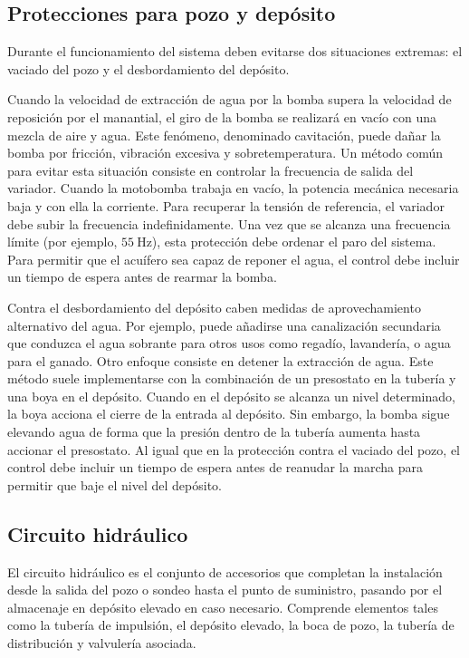 \subsection{Protecciones para pozo y depósito}

Durante el funcionamiento del sistema deben evitarse dos situaciones
extremas: el vaciado del pozo y el desbordamiento del depósito.

Cuando la velocidad de extracción de agua por la bomba supera la velocidad
de reposición por el manantial, el giro de la bomba se realizará en
vacío con una mezcla de aire y agua. Este fenómeno, denominado cavitación,
puede dañar la bomba por fricción, vibración excesiva y sobretemperatura.
Un método común para evitar esta situación consiste en controlar la
frecuencia de salida del variador. Cuando la motobomba trabaja en
vacío, la potencia mecánica necesaria baja y con ella la corriente.
Para recuperar la tensión de referencia, el variador debe subir la
frecuencia indefinidamente. Una vez que se alcanza una frecuencia
límite (por ejemplo, $\SI{55}{\hertz}$), esta protección debe ordenar
el paro del sistema. Para permitir que el acuífero sea capaz de reponer
el agua, el control debe incluir un tiempo de espera antes de rearmar
la bomba.

Contra el desbordamiento del depósito caben medidas de aprovechamiento
alternativo del agua. Por ejemplo, puede añadirse una canalización
secundaria que conduzca el agua sobrante para otros usos como regadío,
lavandería, o agua para el ganado. Otro enfoque consiste en detener
la extracción de agua. Este método suele implementarse con la combinación
de un presostato en la tubería y una boya en el depósito. Cuando en
el depósito se alcanza un nivel determinado, la boya acciona el cierre
de la entrada al depósito. Sin embargo, la bomba sigue elevando agua
de forma que la presión dentro de la tubería aumenta hasta accionar
el presostato. Al igual que en la protección contra el vaciado del
pozo, el control debe incluir un tiempo de espera antes de reanudar
la marcha para permitir que baje el nivel del depósito.


\subsection{Circuito hidráulico}

El circuito hidráulico es el conjunto de accesorios que completan
la instalación desde la salida del pozo o sondeo hasta el punto de
suministro, pasando por el almacenaje en depósito elevado en caso
necesario. Comprende elementos tales como la tubería de impulsión,
el depósito elevado, la boca de pozo, la tubería de distribución y
valvulería asociada. 

